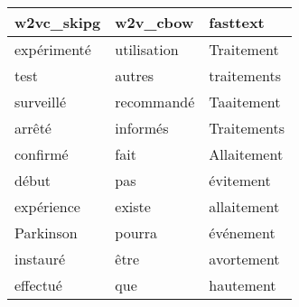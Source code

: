 \begin{tabular}{lll}
\toprule
  w2vc\_skipg &     w2v\_cbow &     fasttext \\
\midrule
 expérimenté &  utilisation &   Traitement \\
        test &       autres &  traitements \\
   surveillé &   recommandé &   Taaitement \\
      arrêté &     informés &  Traitements \\
    confirmé &         fait &  Allaitement \\
       début &          pas &    évitement \\
  expérience &       existe &  allaitement \\
   Parkinson &       pourra &    événement \\
    instauré &         être &   avortement \\
    effectué &          que &    hautement \\
\bottomrule
\end{tabular}
